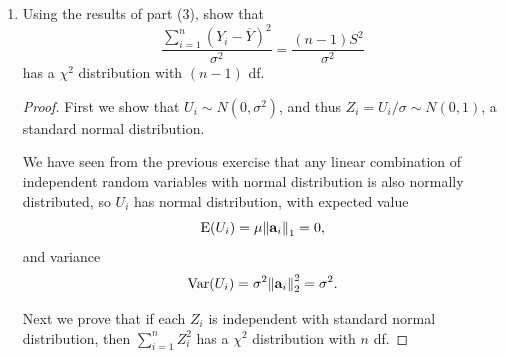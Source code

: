 \documentclass[10pt]{article}
\begin{document}
\begin{enumerate}
\begin{proof}
\begin{align*}
				\sum_{i=1}^n (Y_i - \overline{Y})^2 &= \sum_{i=1}^n (Y_i^2 - 2Y_i\overline{Y} + \overline{Y}^2) \\
				&= \sum_{i=1}^n Y_i^2 - n \overline{Y}^2 \\
				&= \vb{Y}^{\top} A^{\top} A \vb{Y} - n \overline{Y}^2 \\
				&=
				\begin{bmatrix}
					\overline{Y} \sqrt{n}, &
					U_1, &
					U_2, &
					\cdots, &
					U_{n-1}
				\end{bmatrix}
				\begin{bmatrix}
					\overline{Y} \sqrt{n} \\
					U_1 \\
					U_2 \\
					\vdots \\
					U_{n-1}
				\end{bmatrix} - n \overline{Y}^2 \\
				&= \sum_{i=1}^{n-1} U_i^2
			\end{align*}
			Since $U_i$ is independent of $\overline{Y}$, $\sum_{i=1}^{n-1} U_i^2$ is also independet of $\overline{Y}$.
		\end{proof}
		\item Using the results of part (3), show that
		\begin{equation}
			\frac{\sum_{i=1}^n (Y_i - \overline{Y})^2}{\sigma^2} = \frac{(n-1)S^2}{\sigma^2} \label{eq: chi squared n-1 df}
		\end{equation}
		has a $\chi^2$ distribution with $(n-1)$ df.
		\begin{proof}
			First we show that $U_i \sim N(0, \sigma^2)$, and thus $Z_i = U_i/\sigma \sim N(0, 1)$, a standard normal distribution.

			We have seen from the previous exercise that any linear combination of independent random variables with normal distribution is also normally distributed, so $U_i$ has normal distribution, with expected value
			\begin{equation}
				\operatorname{E}(U_i) = \mu \norm{\vb{a}_i}_1 = 0,
			\end{equation}
			and variance
			\begin{equation}
				\operatorname{Var}(U_i) = \sigma^2 \norm{\vb{a}_i}_2^2 = \sigma^2.
			\end{equation}

			Next we prove that if each $Z_i$ is independent with standard normal distribution, then $\sum_{i = 1}^n Z_i^2$ has a $\chi^2$ distribution with $n$ df.


\end{proof}
\end{enumerate}
\end{document}
